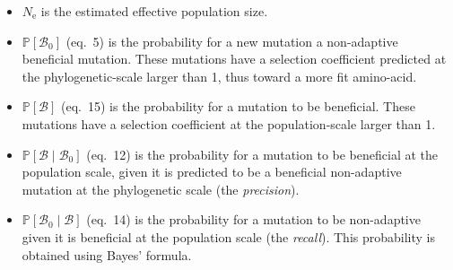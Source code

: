 \documentclass{article}
\newcommand{\Ne}{N_{\text{e}}}
\newcommand{\proba}{\mathbb{P}}
\newcommand{\SphyBen}{\mathcal{B}_0}
\newcommand{\given}{\mid}
\newcommand{\SpopBen}{\mathcal{B}}
\begin{document}
    \begin{itemize}
        \item $\Ne$ is the estimated effective population size.
        \item $\proba [ \SphyBen ]$ (eq.~5) is the probability for a new mutation a non-adaptive beneficial mutation.
        These mutations have a selection coefficient predicted at the phylogenetic-scale larger than 1, thus toward a more fit amino-acid.
        \item $\proba [ \SpopBen ]$ (eq.~15) is the probability for a mutation to be beneficial.
        These mutations have a selection coefficient at the population-scale larger than 1.
        \item $\proba [ \SpopBen \given \SphyBen]$ (eq.~12) is the probability for a mutation to be beneficial at the population scale, given it is predicted to be a beneficial non-adaptive mutation at the phylogenetic scale (the \textit{precision}).
        \item $\proba [ \SphyBen \given \SpopBen]$ (eq.~14) is the probability for a mutation to be non-adaptive given it is beneficial at the population scale (the \textit{recall}).
        This probability is obtained using Bayes' formula.
    \end{itemize}
\end{document}
